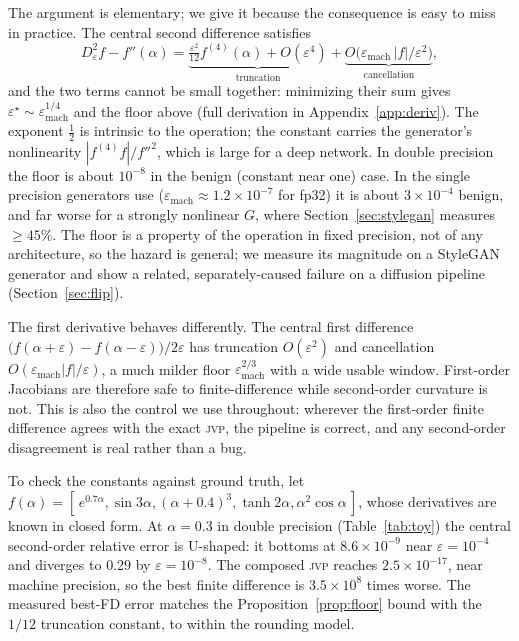 \documentclass[10pt]{article} %
\newcommand{\jvp}{\textsc{jvp}}
\newcommand{\eps}{\varepsilon}
\begin{document}
The argument is elementary; we give it because the consequence is easy to miss in
practice. The central second difference satisfies
\[
D^2_\eps f - f''(\alpha)
=\underbrace{\tfrac{\eps^2}{12}f^{(4)}(\alpha)+O(\eps^4)}_{\text{truncation}}
+\underbrace{O\!\big(\eps_{\mathrm{mach}}\,|f|/\eps^2\big)}_{\text{cancellation}} ,
\]
and the two terms cannot be small together: minimizing their sum gives
$\eps^\star\sim\eps_{\mathrm{mach}}^{1/4}$ and the floor above (full derivation in
Appendix~\ref{app:deriv}). The exponent $\tfrac12$ is intrinsic to the operation;
the constant carries the generator's nonlinearity $|f^{(4)}f|/f''^2$, which is
large for a deep network. In double
precision the floor is about $10^{-8}$ in the benign (constant near one) case. In
the single precision generators use ($\eps_{\mathrm{mach}}\approx1.2\times10^{-7}$
for fp32) it is about $3\times10^{-4}$ benign, and far worse for a strongly
nonlinear $G$, where Section~\ref{sec:stylegan} measures $\geq45\%$. The floor is a
property of the operation in fixed precision, not of any architecture, so the
hazard is general; we measure its magnitude on a StyleGAN generator and show a
related, separately-caused failure on a diffusion pipeline (Section~\ref{sec:flip}).

The first derivative behaves differently. The central first difference
$\big(f(\alpha+\eps)-f(\alpha-\eps)\big)/2\eps$ has truncation $O(\eps^2)$ and
cancellation $O(\eps_{\mathrm{mach}}|f|/\eps)$, a much milder floor
$\eps_{\mathrm{mach}}^{2/3}$ with a wide usable window. First-order Jacobians are
therefore safe to finite-difference while second-order curvature is not. This is
also the control we use throughout: wherever the first-order finite difference
agrees with the exact \jvp, the pipeline is correct, and any second-order
disagreement is real rather than a bug.

To check the constants against ground truth, let
$f(\alpha)=[\,e^{0.7\alpha},\sin 3\alpha,(\alpha+0.4)^3,\tanh 2\alpha,
\alpha^2\cos\alpha\,]$, whose derivatives are known in closed form. At
$\alpha=0.3$ in double precision (Table~\ref{tab:toy}) the central second-order
relative error is U-shaped: it bottoms at $8.6\times10^{-9}$ near $\eps=10^{-4}$
and diverges to $0.29$ by $\eps=10^{-8}$. The composed \jvp{} reaches
$2.5\times10^{-17}$, near machine precision, so the best finite difference is
$3.5\times10^{8}$ times worse. The measured best-FD error matches the
Proposition~\ref{prop:floor} bound with the $1/12$ truncation constant, to within
the rounding model.
\end{document}
